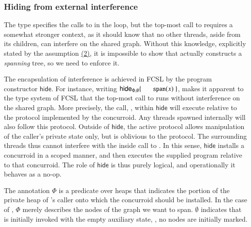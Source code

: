 
\subsubsection{Hiding from external interference}
\label{sec:restr-extern-interf}
%
The type  specifies the calls to  in the
loop, but the top-most call to  requires a somewhat
stronger context, as it should know that no other threads, aside from
its children, can interfere on the shared graph. Without this
knowledge, explicitly stated by the assumption \hyperlink{asm2}{(2)},
it is impossible to show that  actually constructs a
\emph{spanning} tree, so we need to enforce it.

The encapsulation of interference is achieved in FCSL by the program
constructor $\mathsf{hide}$. For instance, writing
%
$\mathsf{hide}_{\Phi, \emptyset}\{~\esc{span}(x)~\}$,
%
makes it apparent to the type system of FCSL that the top-most call to
 runs without interference on the shared graph.  More
precisely, the call, , within $\mathsf{hide}$ will
execute relative to the protocol implemented by the 
concurroid. Any threads spawned internally will also follow this
protocol.  Outside of $\mathsf{hide}$, the active protocol allows
manipulation of the caller's private state only, but is oblivious to
the  protocol. The surrounding threads thus cannot
interfere with the inside call to . In this sense,
$\mathsf{hide}$ installs a concurroid in a scoped manner, and then
executes the supplied program relative to that concurroid. The role of
$\mathsf{hide}$ is thus purely logical, and operationally it behaves
as a no-op.

The annotation $\Phi$ is a predicate over heaps that indicates the
portion of the private heap of 's caller onto which the
 concurroid should be installed. In the case of
, $\Phi$ merely describes the nodes of the graph we want to
span. $\emptyset$ indicates that  is initially invoked with
the empty auxiliary state, \ie, no nodes are initially marked.

